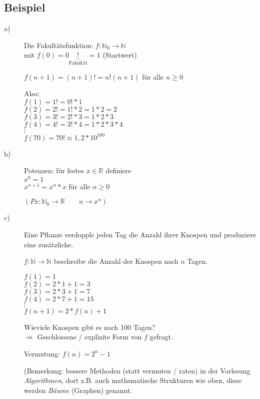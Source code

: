 \documentclass[a4paper, 12pt, twoside] {article}
\begin{document}
\subsection{Beispiel}
\begin{description}

\item[a)] Die Fakultätsfunktion:
$f \colon \mathbb{N}_0 \rightarrow \mathbb{N}$ \\
mit $f(0) = 0\underbrace{!}_{\text{Fakultät}} = 1$ (Startwert)

$f(n+1) = (n+1)! = n! (n + 1)$ für alle $n \geq 0$

Also: \\
$f(1) = 1! = 0! * 1$ \\
$f(2) = 2! = 1! *2 = 1 * 2 = 2$ \\
$f(3) = 3! = 2!*3 = 1 * 2 * 3$ \\
$f(4) = 4! = 3!*4 = 1 * 2 * 3 * 4$ \\
$\vdots$ \\
$f(70) = 70! \approx 1,2*10^{100}$

\item[b)] Potenzen: für festes $x \in \mathbb{R}$ definiere \\
$x^0 =1$ \\
$x^{n+1} = x^n * x$ für alle $n \geq 0$

$(Px : \mathbb{N}_0 \rightarrow \mathbb{R} \qquad n \rightarrow x^n)$

\item[c)] Eine Pflanze verdopple jeden Tag die Anzahl ihrer Knospen und produziere eine zusätzliche.

$f \colon \mathbb{N} \rightarrow \mathbb{N}$ beschreibe die Anzahl der Knospen nach $n$ Tagen.

$f(1) = 1$ \\
$f(2) = 2*1 + 1 = 3$ \\
$f(3) = 2*3 + 1 = 7$ \\
$f(4) = 2*7+1 = 15$ \\
$\vdots$ \\
$f(n+1) = 2 * f(n) +1$


Wieviele Knospen gibt es nach 100 Tagen? \\
$\Rightarrow$ Geschlossene / explizite Form von $f$ gefragt.

Vermutung: $f(n) = 2^n - 1$

(Bemerkung: bessere Methoden (statt vermuten / raten) in der Vorlesung \textit{Algorithmen}, dort z.B. auch mathematische Strukturen wie oben, diese werden \textit{Bäume} (Graphen) genannt.


\end{description}
\end{document}
